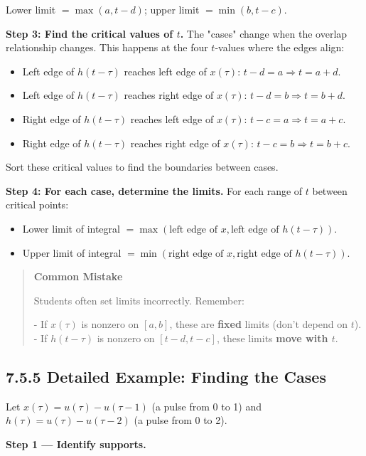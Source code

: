 \documentclass[11pt]{article}
\begin{document}
Lower limit $= \max(a, t-d)$; upper limit $= \min(b, t-c)$.

\textbf{Step 3: Find the critical values of $t$.} The "cases" change when the overlap relationship changes. This happens at the four $t$-values where the edges align:

\begin{itemize}
  \item Left edge of $h(t-\tau)$ reaches left edge of $x(\tau)$: $t-d = a \Rightarrow t = a+d$.
  \item Left edge of $h(t-\tau)$ reaches right edge of $x(\tau)$: $t-d = b \Rightarrow t = b+d$.
  \item Right edge of $h(t-\tau)$ reaches left edge of $x(\tau)$: $t-c = a \Rightarrow t = a+c$.
  \item Right edge of $h(t-\tau)$ reaches right edge of $x(\tau)$: $t-c = b \Rightarrow t = b+c$.
\end{itemize}

Sort these critical values to find the boundaries between cases.

\textbf{Step 4: For each case, determine the limits.} For each range of $t$ between critical points:

\begin{itemize}
  \item Lower limit of integral $=\max(\text{left edge of } x,\text{left edge of } h(t-\tau))$.
  \item Upper limit of integral $=\min(\text{right edge of } x,\text{right edge of } h(t-\tau))$.
\end{itemize}

\begin{quote}
\textbf{Common Mistake}

Students often set limits incorrectly. Remember:

- If $x(\tau)$ is nonzero on $[a,b]$, these are \textbf{fixed} limits (don't depend on $t$).
- If $h(t-\tau)$ is nonzero on $[t-d,t-c]$, these limits \textbf{move with $t$}.
\end{quote}

\subsection*{7.5.5 Detailed Example: Finding the Cases}

Let $x(\tau) = u(\tau) - u(\tau - 1)$ (a pulse from 0 to 1) and $h(\tau) = u(\tau) - u(\tau - 2)$ (a pulse from 0 to 2).

\textbf{Step 1 — Identify supports.}
\end{document}
